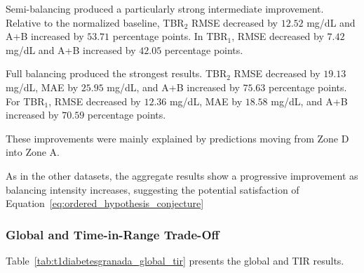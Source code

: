 Semi-balancing produced a particularly strong intermediate improvement. Relative to the normalized baseline, TBR$_2$ RMSE decreased by \(12.52\) mg/dL and A+B increased by \(53.71\) percentage points. In TBR$_1$, RMSE decreased by \(7.42\) mg/dL and A+B increased by \(42.05\) percentage points.

Full balancing produced the strongest results. TBR$_2$ RMSE decreased by \(19.13\) mg/dL, MAE by \(25.95\) mg/dL, and A+B increased by \(75.63\) percentage points. For TBR$_1$, RMSE decreased by \(12.36\) mg/dL, MAE by \(18.58\) mg/dL, and A+B increased by \(70.59\) percentage points.

These improvements were mainly explained by predictions moving from Zone D into Zone A.

As in the other datasets, the aggregate results show a progressive improvement as balancing intensity increases, suggesting the potential satisfaction of Equation~\ref{eq:ordered_hypothesis_conjecture}

\subsubsection{Global and Time-in-Range Trade-Off}
\label{subsubsec:t1diabetesgranadaglobal_tir}

Table~\ref{tab:t1diabetesgranada_global_tir} presents the global and TIR results.

\begin{table}[htbp]
    \centering
    \caption{Aggregate global and TIR performance in
    T1DiabetesGranada, averaged across balancing methods.}
    \label{tab:t1diabetesgranada_global_tir}
\end{table}

